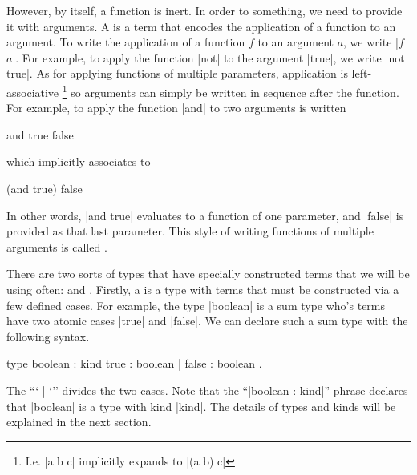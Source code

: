 However, by itself, a function is inert.
In order to  something, we need to provide it with arguments.
A  is a term that encodes the application of a function to an argument.
To write the application of a function $f$ to an argument $a$, we write \code|$f$ $a$|.
For example, to apply the function \code|not| to the argument \code|true|, we write \code|not true|.
As for applying functions of multiple parameters, application is left-associative%
\footnote{
  I.e. \code|a b c| implicitly expands to \code|(a b) c|
}
so arguments can simply be written in sequence after the function.
For example, to apply the function \code|and| to two arguments is written
%
\begin{snippet}
and true false
\end{snippet}
%
which implicitly associates to
%
\begin{snippet}
(and true) false
\end{snippet}
%
In other words, \code|and true| evaluates to a function of one parameter, and \code|false| is provided as that last parameter.
This style of writing functions of multiple arguments is called .

There are two sorts of types that have specially constructed terms that we will be using often:  and .
Firstly, a  is a type with terms that must be constructed via a few defined cases.
For example, the type \code|boolean| is a sum type who's terms have two atomic cases \code|true| and \code|false|.
We can declare such a sum type with the following syntax.
%
\begin{snippet}
type boolean : kind
  { true  : boolean
  | false : boolean }.
\end{snippet}
%
The ``\code` | `'' divides the two cases.
Note that the ``\code|boolean : kind|'' phrase declares that \code|boolean| is a type with kind \code|kind|.
The details of types and kinds will be explained in the next section.

